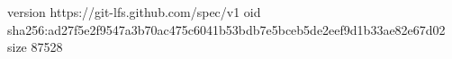 version https://git-lfs.github.com/spec/v1
oid sha256:ad27f5e2f9547a3b70ac475c6041b53bdb7e5bceb5de2eef9d1b33ae82e67d02
size 87528
